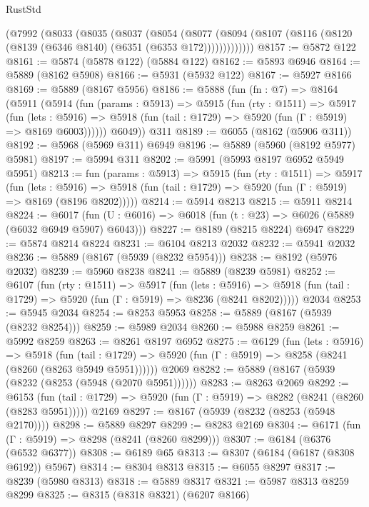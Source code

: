 \begin{lexlean}{RustStd}
\begin{coremodule}
    (@7992
      (@8033
        (@8035
          (@8037
            (@8054
              (@8077
                (@8094 (@8107 (@8116 (@8120 (@8139 (@6346 @8140) (@6351 (@6353 @172)))))))))))))
@8157 := @5872 @122
@8161 := @5874 (@5878 @122) (@5884 @122)
@8162 := @5893 @6946
@8164 := @5889 (@8162 @5908)
@8166 := @5931 (@5932 @122)
@8167 := @5927 @8166
@8169 := @5889 (@8167 @5956)
@8186 := @5888
    (fun (fn : @7) =>
    @8164
      (@5911
        (@5914
          (fun (params : @5913) =>
          @5915
            (fun (rty : @1511) =>
            @5917
              (fun (lets : @5916) =>
              @5918 (fun (tail : @1729) => @5920 (fun (Γ : @5919) => @8169 @6003))))))
        @6049))
    @311
@8189 := @6055 (@8162 (@5906 @311))
@8192 := @5968 (@5969 @311) @6949
@8196 := @5889 (@5960 (@8192 @5977) @5981)
@8197 := @5994 @311
@8202 := @5991 (@5993 @8197 @6952 @5949 @5951)
@8213 := fun (params : @5913) =>
  @5915
    (fun (rty : @1511) =>
    @5917
      (fun (lets : @5916) =>
      @5918 (fun (tail : @1729) => @5920 (fun (Γ : @5919) => @8169 (@8196 @8202)))))
@8214 := @5914 @8213
@8215 := @5911 @8214
@8224 := @6017 (fun (U : @6016) => @6018 (fun (t : @23) => @6026 (@5889 (@6032 @6949 @5907) @6043)))
@8227 := @8189 (@8215 @8224) @6947
@8229 := @5874 @8214 @8224
@8231 := @6104 @8213 @2032
@8232 := @5941 @2032
@8236 := @5889 (@8167 (@5939 (@8232 @5954)))
@8238 := @8192 (@5976 @2032)
@8239 := @5960 @8238
@8241 := @5889 (@8239 @5981)
@8252 := @6107
    (fun (rty : @1511) =>
    @5917
      (fun (lets : @5916) =>
      @5918 (fun (tail : @1729) => @5920 (fun (Γ : @5919) => @8236 (@8241 @8202)))))
    @2034
@8253 := @5945 @2034
@8254 := @8253 @5953
@8258 := @5889 (@8167 (@5939 (@8232 @8254)))
@8259 := @5989 @2034
@8260 := @5988 @8259
@8261 := @5992 @8259
@8263 := @8261 @8197 @6952
@8275 := @6129
    (fun (lets : @5916) =>
    @5918
      (fun (tail : @1729) => @5920 (fun (Γ : @5919) => @8258 (@8241 (@8260 (@8263 @5949 @5951))))))
    @2069
@8282 := @5889 (@8167 (@5939 (@8232 (@8253 (@5948 (@2070 @5951))))))
@8283 := @8263 @2069
@8292 := @6153
    (fun (tail : @1729) => @5920 (fun (Γ : @5919) => @8282 (@8241 (@8260 (@8283 @5951)))))
    @2169
@8297 := @8167 (@5939 (@8232 (@8253 (@5948 @2170))))
@8298 := @5889 @8297
@8299 := @8283 @2169
@8304 := @6171 (fun (Γ : @5919) => @8298 (@8241 (@8260 @8299)))
@8307 := @6184 (@6376 (@6532 @6377))
@8308 := @6189 @65
@8313 := @8307 (@6184 (@6187 (@8308 @6192)) @5967)
@8314 := @8304 @8313
@8315 := @6055 @8297
@8317 := @8239 (@5980 @8313)
@8318 := @5889 @8317
@8321 := @5987 @8313 @8259 @8299
@8325 := @8315 (@8318 @8321) (@6207 @8166)

\end{coremodule}
\end{lexlean}
